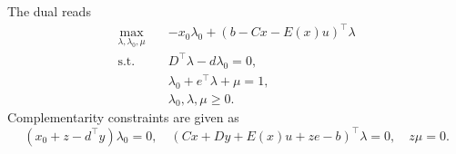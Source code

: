The dual reads 
\begin{subequations}
    \label{eq:ccg:farkas}
    \begin{align}
        \max_{\lambda,\lambda_0,\mu} \quad & -x_0\lambda_0 + (b - Cx - E(x)u)^\top \lambda \\
        \text{s.t.} \quad & D^\top\lambda - d\lambda_0 = 0, \\
        & \lambda_0 + e^\top\lambda + \mu = 1, \\
        & \lambda_0, \lambda, \mu \ge 0.
    \end{align}
\end{subequations}
Complementarity constraints are given as 
\begin{equation*}
    (x_0 + z - d^\top y)\lambda_0 = 0, \quad 
    (Cx + Dy + E(x)u + ze - b)^\top \lambda = 0, \quad 
    z\mu = 0.
\end{equation*}






